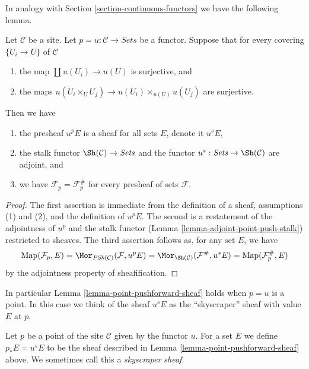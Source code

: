 \noindent
In analogy with Section \ref{section-continuous-functors}
we have the following lemma.

\begin{lemma}
\label{lemma-point-pushforward-sheaf}
Let $\mathcal{C}$ be a site. Let $p = u : \mathcal{C} \to \textit{Sets}$
be a functor. Suppose that for every covering $\{U_i \to U\}$ of $\mathcal{C}$
\begin{enumerate}
\item the map $\coprod u(U_i) \to u(U)$ is surjective, and
\item the maps
$u(U_i \times_U U_j) \to u(U_i) \times_{u(U)} u(U_j)$ are surjective.
\end{enumerate}
Then we have
\begin{enumerate}
\item the presheaf $u^pE$ is a sheaf for all sets $E$, denote it $u^sE$,
\item the stalk functor $\Sh(\mathcal{C}) \to \textit{Sets}$
and the functor $u^s: \textit{Sets} \to \Sh(\mathcal{C})$ are
adjoint, and
\item we have $\mathcal{F}_p = \mathcal{F}^\#_p$
for every presheaf of sets $\mathcal{F}$.
\end{enumerate}
\end{lemma}

\begin{proof}
The first assertion is immediate from the definition of a sheaf, assumptions
(1) and (2), and the definition of $u^pE$. The second is a restatement of the
adjointness of $u^p$ and the stalk functor
(Lemma \ref{lemma-adjoint-point-push-stalk}) restricted to sheaves.
The third assertion follows as, for any set $E$, we have
$$
\text{Map}(\mathcal{F}_p, E) =
\Mor_{\textit{PSh}(\mathcal{C})}(\mathcal{F}, u^pE) =
\Mor_{\Sh(\mathcal{C})}(\mathcal{F}^\#, u^sE) =
\text{Map}(\mathcal{F}^\#_p, E)
$$
by the adjointness property of sheafification.
\end{proof}

\noindent
In particular Lemma \ref{lemma-point-pushforward-sheaf}
holds when $p = u$ is a point. In this case we think of the
sheaf $u^sE$ as the ``skyscraper'' sheaf with value $E$ at $p$.

\begin{definition}
\label{definition-pushforward-point}
Let $p$ be a point of the site $\mathcal{C}$ given by the functor $u$.
For a set $E$ we define $p_*E = u^sE$ to be the sheaf
described in Lemma \ref{lemma-point-pushforward-sheaf} above.
We sometimes call this a {\it skyscraper sheaf}.
\end{definition}

